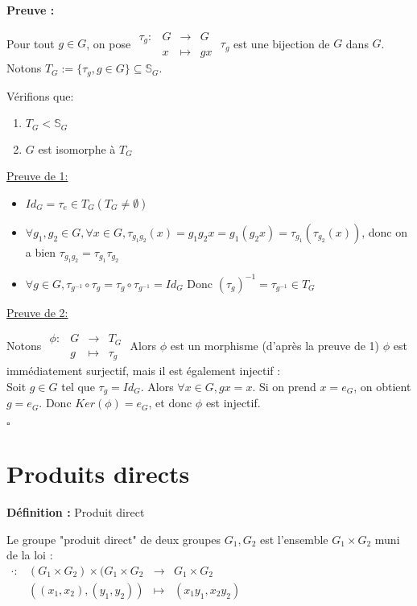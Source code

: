 \documentclass{report}
\renewenvironment{leftbar}{%
  \def\FrameCommand{\vrule width 0.4pt \hspace{10pt}}%
  \MakeFramed {\advance\hsize-\width \FrameRestore}}%
 {\endMakeFramed}%
\newenvironment{definition}[1][]{
    \begin{tcolorbox}[colframe= white]
    \textbf{Définition :} 
    #1 \par
    }
    {\end{tcolorbox}}
\newenvironment{preuve}{\vspace*{0.5cm}
    \begin{leftbar}
    \noindent\textbf{Preuve :}\par}{
    \begin{flushright}
    $\square$
    \end{flushright}
    \end{leftbar}
}
\newcommand{\fonction}[5]{
    \begin{array}{l|rcl}
    #1: & #2 & \longrightarrow & #3 \\
        & #4 & \longmapsto & #5 
    \end{array}
}
\begin{document}
\begin{preuve}
    Pour tout $g\in G$, on pose $\fonction{\tau_g}{G}{G}{x}{gx}$ $\tau_g$ est une bijection de $G$ dans $G$. Notons $T_G := \{\tau_g,g\in G\} \subseteq \mathbb{S}_G$. \par
    \noindent Vérifions que:  \par
    
    \begin{enumerate}
    \item $T_G < \mathbb{S}_G$
    \item $G$ est isomorphe à $T_G$
    \end{enumerate}

\noindent\underline{Preuve de 1:}
\begin{itemize}[label = $\bullet$]
\item $Id_G = \tau_e \in T_G (T_G \neq \emptyset)$
\item  $\forall g_1,g_2 \in G,\forall x \in G, \tau_{g_1 g_2}(x) = g_1 g_2 x = g_1(g_2 x) = \tau_{g_1}(\tau_{g_2}(x))$, donc on a bien $\tau_{g_1 g_2} = \tau_{g_1} \tau_{g_2}$
\item $\forall g \in G, \tau_{g^{-1}} \circ \tau_g = \tau_g \circ \tau_{g^{-1}} = Id_G$ Donc $(\tau_g)^{-1} = \tau_{g^{-1}} \in T_G$
\end{itemize}

\noindent\underline{Preuve de 2:}

    Notons $\fonction{\phi}{G}{T_G}{g}{\tau_g}$
    Alors $\phi$ est un morphisme (d'après la preuve de 1) $\phi$ est immédiatement surjectif, mais il est également injectif :\\
Soit $g\in G$ tel que $\tau_g = Id_G$. Alors $\forall x \in G, gx =  x$. Si on prend $x =  e_G$, on obtient $g = e_G$. Donc $Ker(\phi) = {e_G}$, et donc $\phi$ est injectif.
\end{preuve}

\section{Produits directs}

\begin{definition}[Produit direct]
    Le groupe "produit direct" de deux groupes $G_1, G_2$ est l'ensemble $G_1 \times G_2$ muni de la loi :\\
    $\fonction{\cdot}{(G_1 \times G_2)\times(G_1 \times G_2}{G_1 \times G_2}{((x_1 ,x_2),(y_1 ,y_2))}{(x_1 y_1 ,x_2 y_2)}$
\end{definition}
\end{document}
